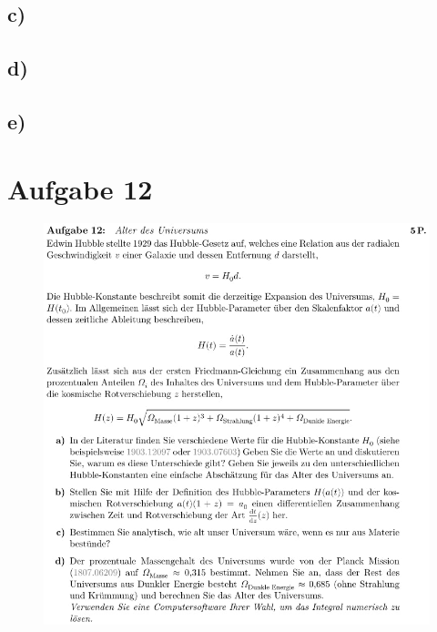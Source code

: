     \subsection{c)}

    \subsection{d)}

    \subsection{e)}

\section{Aufgabe 12}

    \begin{figure}[H]
        \centering
        \includegraphics[width=\textwidth]{images/Aufgabe12.jpg}
        \label{fig:5}
    \end{figure}

